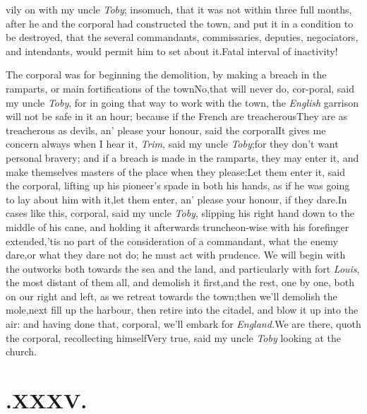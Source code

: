 \documentclass{article}
\begin{document}
\noindent
\stick{\indent\astfill}
\stick{\astfill}
vily on with my uncle \textit{Toby}; insomuch, that it
was not within three full months, after he and the corporal had
constructed the town, and put it in a condition to be destroyed,
that the several commandants, commissaries, deputies, negociators,
and intendants, would permit him to set about
it.\tsh Fatal interval of inactivity!

The corporal was for beginning the demolition, by making a
breach in the ramparts, or main fortifications of the
town\tsh No,\tsk that will never do, cor-\break poral, said my
uncle \textit{Toby}, for in going that way to work with the town, the\break
\textit{English} garrison will not be safe in it an hour; because if
the French are treacherous\tsh They are as treacherous as devils,
an’ please your honour, said the corporal\tsh It
gives me concern always when I hear it, \textit{Trim}, said my uncle
\textit{Toby};\tsk for they don’t want personal bravery; and
if a breach is made in the ramparts, they may enter it, and make
themselves masters of the place when they please:\tsk Let them
enter it, said the corporal, lifting up his pioneer’s spade
in both his hands, as if he was going to lay about him with
it,\tsk let them enter, an’ please your honour, if they
dare.\tsh In cases like this, corporal, said my uncle
\textit{Toby}, slipping his right hand down to the middle of his
cane, and holding it afterwards truncheon-wise with his forefinger
extended,\break\tsh ’tis no part of the consideration of a
commandant, what the enemy dare,\tsk or what they dare not do; he
must act with prudence. We will begin with the outworks both
towards the sea and the land, and particularly with fort
\textit{Louis}, the most distant of them all, and demolish it
first,\tsk and the rest, one by one, both on our right and left, as we retreat towards
the town;\tsh then we’ll demolish the
mole,\tsk next fill up the harbour,\break
\tsk then retire into the citadel, and blow it up into the air: and having done
that, corporal, we’ll embark for \textit{England.}\tsh We are there, quoth the
corporal, recollecting himself\tsh Very true, said my uncle \textit{Toby}\tsk
looking at the church.
\vfill{}\eject
\section{.\enspace XXXV.}
\end{document}
